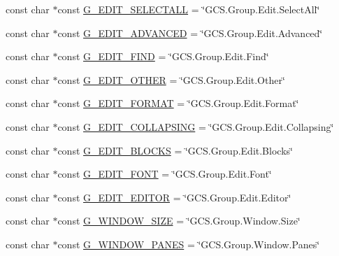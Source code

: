 \begin{DoxyCompactItemize}
\item 
const char $\ast$const \hyperlink{group___core_plugin_gaa884d741f6c93335368ca06c9385686d}{G\-\_\-\-E\-D\-I\-T\-\_\-\-S\-E\-L\-E\-C\-T\-A\-L\-L} = \char`\"{}G\-C\-S.\-Group.\-Edit.\-Select\-All\char`\"{}
\item 
const char $\ast$const \hyperlink{group___core_plugin_ga8c4e9323975b84f0aa8c1441ea913b4e}{G\-\_\-\-E\-D\-I\-T\-\_\-\-A\-D\-V\-A\-N\-C\-E\-D} = \char`\"{}G\-C\-S.\-Group.\-Edit.\-Advanced\char`\"{}
\item 
const char $\ast$const \hyperlink{group___core_plugin_ga6ecc58afd57743a48547fde417de7b7b}{G\-\_\-\-E\-D\-I\-T\-\_\-\-F\-I\-N\-D} = \char`\"{}G\-C\-S.\-Group.\-Edit.\-Find\char`\"{}
\item 
const char $\ast$const \hyperlink{group___core_plugin_ga31fd4c00dfea19dfd2a96d293f1e86ea}{G\-\_\-\-E\-D\-I\-T\-\_\-\-O\-T\-H\-E\-R} = \char`\"{}G\-C\-S.\-Group.\-Edit.\-Other\char`\"{}
\item 
const char $\ast$const \hyperlink{group___core_plugin_gae220a227e5bf352b19abf50093720c21}{G\-\_\-\-E\-D\-I\-T\-\_\-\-F\-O\-R\-M\-A\-T} = \char`\"{}G\-C\-S.\-Group.\-Edit.\-Format\char`\"{}
\item 
const char $\ast$const \hyperlink{group___core_plugin_ga5765170a2baf55a34033de3abf016362}{G\-\_\-\-E\-D\-I\-T\-\_\-\-C\-O\-L\-L\-A\-P\-S\-I\-N\-G} = \char`\"{}G\-C\-S.\-Group.\-Edit.\-Collapsing\char`\"{}
\item 
const char $\ast$const \hyperlink{group___core_plugin_ga975093fc4492408a339657e017d7ef52}{G\-\_\-\-E\-D\-I\-T\-\_\-\-B\-L\-O\-C\-K\-S} = \char`\"{}G\-C\-S.\-Group.\-Edit.\-Blocks\char`\"{}
\item 
const char $\ast$const \hyperlink{group___core_plugin_gaa9facf2424e9b026dd0726ef0c4c69a7}{G\-\_\-\-E\-D\-I\-T\-\_\-\-F\-O\-N\-T} = \char`\"{}G\-C\-S.\-Group.\-Edit.\-Font\char`\"{}
\item 
const char $\ast$const \hyperlink{group___core_plugin_ga409a8db932ed17224f0e72e856797fba}{G\-\_\-\-E\-D\-I\-T\-\_\-\-E\-D\-I\-T\-O\-R} = \char`\"{}G\-C\-S.\-Group.\-Edit.\-Editor\char`\"{}
\item 
const char $\ast$const \hyperlink{group___core_plugin_gaf7898919dfa3c4899d7c7fae6771ec53}{G\-\_\-\-W\-I\-N\-D\-O\-W\-\_\-\-S\-I\-Z\-E} = \char`\"{}G\-C\-S.\-Group.\-Window.\-Size\char`\"{}
\item 
const char $\ast$const \hyperlink{group___core_plugin_gac4d0d1e3f9431aeac156aadf24d299d5}{G\-\_\-\-W\-I\-N\-D\-O\-W\-\_\-\-P\-A\-N\-E\-S} = \char`\"{}G\-C\-S.\-Group.\-Window.\-Panes\char`\"{}

\end{DoxyCompactItemize}
